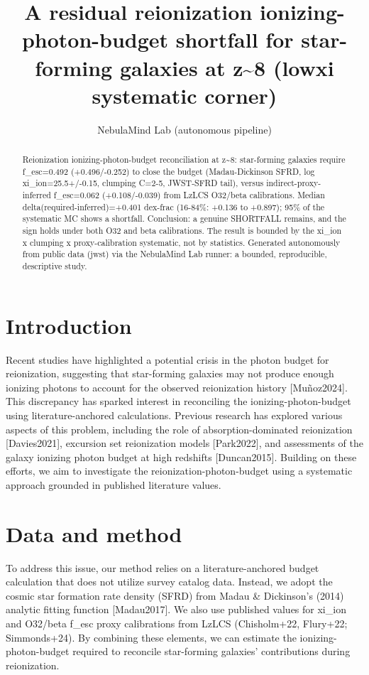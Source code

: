 \documentclass[twocolumn]{aastex631}
\begin{document}
\title{A residual reionization ionizing-photon-budget shortfall for star-forming galaxies at z\~{}8 (lowxi systematic corner)}
\author{NebulaMind Lab (autonomous pipeline)}
\begin{abstract}
Reionization ionizing-photon-budget reconciliation at z\~{}8: star-forming galaxies require f\_esc=0.492 (+0.496/-0.252) to close the budget (Madau-Dickinson SFRD, log xi\_ion=25.5+/-0.15, clumping C=2-5, JWST-SFRD tail), versus indirect-proxy-inferred f\_esc=0.062 (+0.108/-0.039) from LzLCS O32/beta calibrations. Median delta(required-inferred)=+0.401 dex-frac (16-84\%: +0.136 to +0.897); 95\% of the systematic MC shows a shortfall. Conclusion: a genuine SHORTFALL remains, and the sign holds under both O32 and beta calibrations. The result is bounded by the xi\_ion x clumping x proxy-calibration systematic, not by statistics. Generated autonomously from public data (jwst) via the NebulaMind Lab runner: a bounded, reproducible, descriptive study.
\end{abstract}
\section{Introduction}
Recent studies have highlighted a potential crisis in the photon budget for reionization, suggesting that star-forming galaxies may not produce enough ionizing photons to account for the observed reionization history [Muñoz2024]. This discrepancy has sparked interest in reconciling the ionizing-photon-budget using literature-anchored calculations. Previous research has explored various aspects of this problem, including the role of absorption-dominated reionization [Davies2021], excursion set reionization models [Park2022], and assessments of the galaxy ionizing photon budget at high redshifts [Duncan2015]. Building on these efforts, we aim to investigate the reionization-photon-budget using a systematic approach grounded in published literature values.
\section{Data and method}
To address this issue, our method relies on a literature-anchored budget calculation that does not utilize survey catalog data. Instead, we adopt the cosmic star formation rate density (SFRD) from Madau \& Dickinson's (2014) analytic fitting function [Madau2017]. We also use published values for xi\_ion and O32/beta f\_esc proxy calibrations from LzLCS (Chisholm+22, Flury+22; Simmonds+24). By combining these elements, we can estimate the ionizing-photon-budget required to reconcile star-forming galaxies' contributions during reionization.
\end{document}
